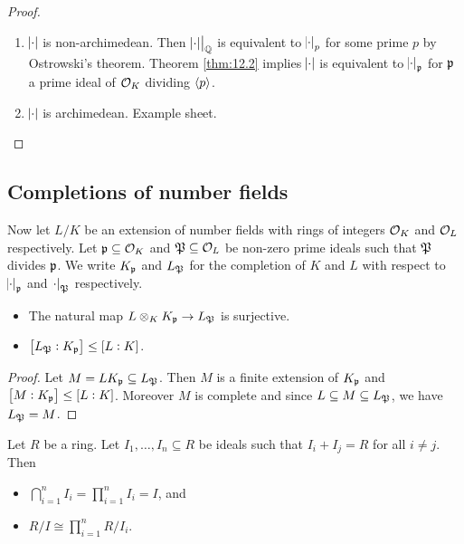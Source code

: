 \begin{proof}
\hfill
\begin{enumerate}[leftmargin=0.5in, label=Case \arabic*.]
\item $ \abs{\cdot} $ is non-archimedean. Then $ \left. \abs{\cdot} \right|_{\mathbb{Q}} $ is equivalent to $ \abs{\cdot}_p $ for some prime $ p $ by Ostrowski's theorem. Theorem \ref{thm:12.2} implies $ \abs{\cdot} $ is equivalent to $ \abs{\cdot}_{\mathfrak{p}} $ for $ \mathfrak{p} $ a prime ideal of $ \mathcal{O}_K $ dividing $ \left\langle p \right\rangle $.
\item $ \abs{\cdot} $ is archimedean. Example sheet.
\end{enumerate}
\end{proof}

\subsection{Completions of number fields}

Now let $ L / K $ be an extension of number fields with rings of integers $ \mathcal{O}_K $ and $ \mathcal{O}_L $ respectively. Let $ \mathfrak{p} \subseteq \mathcal{O}_K $ and $ \mathfrak{P} \subseteq \mathcal{O}_L $ be non-zero prime ideals such that $ \mathfrak{P} $ divides $ \mathfrak{p} $. We write $ K_{\mathfrak{p}} $ and $ L_{\mathfrak{P}} $ for the completion of $ K $ and $ L $ with respect to $ \abs{\cdot}_{\mathfrak{p}} $ and $ \abs{\cdot}_{\mathfrak{P}} $ respectively.

\begin{lemma}
\label{lem:12.4}
\hfill
\begin{itemize}
\item The natural map $ L \otimes_K K_{\mathfrak{p}} \to L_{\mathfrak{P}} $ is surjective.
\item $ \sbr{L_\pp : K_\ppp} \le \sbr{L : K} $.
\end{itemize}
\end{lemma}

\begin{proof}
Let $ M = LK_{\mathfrak{p}} \subseteq L_{\mathfrak{P}} $. Then $ M $ is a finite extension of $ K_{\mathfrak{p}} $ and $ \sbr{M : K_\ppp} \le \sbr{L : K} $. Moreover $ M $ is complete and since $ L \subseteq M \subseteq L_{\mathfrak{P}} $, we have $ L_{\mathfrak{P}} = M $.
\end{proof}

\pagebreak

\begin{lemma}
Let $ R $ be a ring. Let $ I_1, \dots, I_n \subseteq R $ be ideals such that $ I_i + I_j = R $ for all $ i \ne j $. Then
\begin{itemize}
\item $ \bigcap_{i = 1}^n I_i = \prod_{i = 1}^n I_i = I $, and
\item $ R / I \cong \prod_{i = 1}^n R / I_i $.
\end{itemize}
\end{lemma}

